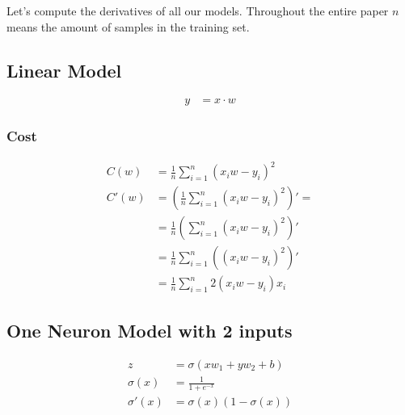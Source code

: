 \documentclass{article}
\begin{document}
Let's compute the derivatives of all our models. Throughout the entire paper $n$ means the amount of samples in the training set.

\subsection{Linear Model}


\begin{center}
\end{center}

\begin{align}
  y &= x \cdot w
\end{align}

\subsubsection{Cost}

\begin{align}
  C(w) &= \frac{1}{n}\sum_{i=1}^{n}(x_iw - y_i)^2 \\
  C'(w)
       &= \left(\frac{1}{n}\sum_{i=1}^{n}(x_iw - y_i)^2\right)' = \\
       &= \frac{1}{n}\left(\sum_{i=1}^{n}(x_iw - y_i)^2\right)' \\
       &= \frac{1}{n}\sum_{i=1}^{n}\left((x_iw - y_i)^2\right)' \\
       &= \frac{1}{n}\sum_{i=1}^{n}2(x_iw - y_i)x_i
\end{align}

\subsection{One Neuron Model with 2 inputs}

\begin{center}
\end{center}
\begin{align}
  z &= \sigma(xw_1 + yw_2 + b) \\
  \sigma(x) &= \frac{1}{1 + e^{-x}} \\
  \sigma'(x) &= \sigma(x)(1 - \sigma(x))
\end{align}
\end{document}
